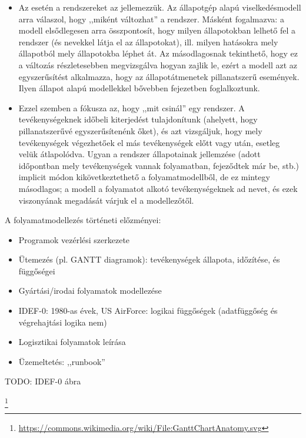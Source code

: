 \begin{itemize}
	\item Az  esetén a rendszereket az  jellemezzük. Az állapotgép alapú viselkedésmodell arra válaszol, hogy ,,miként változhat'' a rendszer. Másként fogalmazva: a modell elsődlegesen arra összpontosít, hogy milyen állapotokban lelhető fel a rendszer (és nevekkel látja el az állapotokat), ill. milyen hatásokra mely állapotból mely állapotokba léphet át. Az másodlagosnak tekinthető, hogy ez a változás részletesebben megvizsgálva hogyan zajlik le, ezért a modell azt az egyszerűsítést alkalmazza, hogy az állapotátmenetek pillanatszerű események. Ilyen állapot alapú modellekkel bővebben   fejezetben foglalkoztunk.
	\item Ezzel szemben a  fókusza az, hogy ,,mit csinál'' egy rendszer. A tevékenységeknek időbeli kiterjedést tulajdonítunk (ahelyett, hogy pillanatszerűvé egyszerűsítenénk őket), és azt vizsgáljuk, hogy mely tevékenységek végezhetőek el más tevékenységek előtt vagy után, esetleg velük átlapolódva. Ugyan a rendszer állapotainak jellemzése (adott időpontban mely tevékenységek vannak folyamatban, fejeződtek már be, stb.) implicit módon kikövetkeztethető a folyamatmodellből, de ez mintegy másodlagos; a modell a folyamatot alkotó tevékenységeknek ad nevet, és ezek viszonyának megadását várjuk el a modellezőtől.
\end{itemize}

\begin{megjegyzes}
A folyamatmodellezés történeti előzményei:

\begin{itemize}
	\item Programok vezérlési szerkezete
	\item Ütemezés (pl. GANTT diagramok): tevékenységek állapota, időzítése, és függőségei
	\item Gyártási/irodai folyamatok modellezése
	\item IDEF-0: 1980-as évek, US AirForce: logikai függőségek (adatfüggőség és végrehajtási logika nem)
	\item Logisztikai folyamatok leírása
	\item Üzemeltetés: ,,runbook''
\end{itemize}

TODO: IDEF-0 ábra



\footnote{\url{https://commons.wikimedia.org/wiki/File:GanttChartAnatomy.svg}}
\end{megjegyzes}

